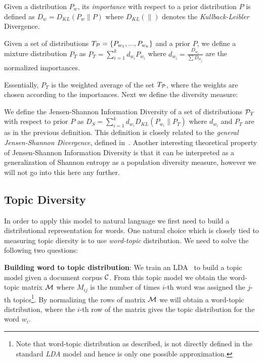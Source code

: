 \documentclass{article} %
\begin{document}
\bed
Given a distribution $P_w$, its {\sl importance} with respect to a
prior distribution $P$ is defined as $D_w = D_{KL}(P_w\|P)$ where $D_{KL}(\|)$ denotes the
{\sl Kullback-Leibler} Divergence.
\eed

\bed\label{mixture}
Given a set of distributions $T_{{\mathcal P}}=\{P_{w_1},...,P_{w_k}\}$ and a
prior $P$, we
define a mixture distribution $P_T$ as $P_T=\sum_{i=1}^k d_{w_i} P_{w_i}$ where $d_{w_i}=\frac{D_{w_i}}{\sum D_{w_j}}$ are the normalized
importances.
\eed

Essentially, $P_T$ is the weighted average of the set $T_{{\mathcal P}}$, where
the weights are chosen according to the importances. Next we
define the diversity measure:

\bed\label{diversity}
We define the Jensen-Shannon Information Diversity of a set of
distributions ${\mathcal P}_T$ with respect to 
prior $P$ as $D_S=\sum_{i=1}^k d_{w_i}D_{KL}(P_{w_i}\|P_T)$
where $d_{w_i}$ and $P_T$ are as in the previous definition.
\eed
This definition is closely related to the 
{\em general Jensen-Shannon Divergence}, defined in~\cite{FugledeTopsoe}. Another
interesting theoretical property of Jensen-Shannon Information
Diversity is that it can be interpreted as a generalization of Shannon
entropy as a population diversity measure, however we will not go
into this here any further. 


\subsection{Topic Diversity}
\label{sec:topic-diversity}

In order to apply this model to natural language we first need to build a distributional representation for words. One
natural choice which is closely tied to measuring topic diersity is to use {\sl word-topic} distribution. We need to solve the following two
questions:

{\bf Building word to topic distribution}: We train an
LDA~\cite{Blei:2003:LDA:944919.944937} to build a topic model given a document corpus ${\mathcal C}$. From this topic model we obtain the
word-topic matrix ${\mathcal M}$ where $M_{ij}$ is the number of times $i$-th word was assigned the $j$-th topics\footnote{Note that word-topic distribution as described, is not directly defined in the standard {\em LDA} model and hence is only one possible approximation.}. By normalizing the rows of matrix ${\mathcal M}$ we will obtain
a word-topic distribution, where the $i$-th row of the matrix gives the topic distribution for the word $w_i$.
\end{document}
